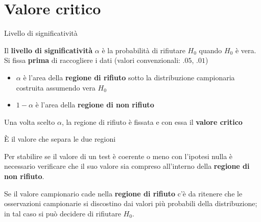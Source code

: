 \documentclass[
  ignorenonframetext,
  compress, aspectratio=149]{beamer}
\providecommand{\tightlist}{%
  \setlength{\itemsep}{0pt}\setlength{\parskip}{0pt}}
\begin{document}
\section{Valore critico}\label{valore-critico}

\begin{frame}{Livello di significatività}
\label{livello-di-significativituxe0}
\small

\begin{tcolorbox}[enhanced jigsaw, opacityback=0, bottomtitle=1mm, bottomrule=.15mm, titlerule=0mm, coltitle=black, toprule=.15mm, breakable, toptitle=1mm, colbacktitle=quarto-callout-tip-color!10!white, arc=.35mm, title={\(\alpha\)}, rightrule=.15mm, leftrule=.75mm, opacitybacktitle=0.6, left=2mm, colframe=quarto-callout-tip-color-frame, colback=white]

Il \textbf{livello di significatività} \(\alpha\) è la probabilità di
rifiutare \(H_0\) quando \(H_0\) è vera. Si fissa \textbf{prima} di
raccogliere i dati (valori convenzionali: \(.05\), \(.01\))

\end{tcolorbox}

\vspace{2mm}

\begin{itemize}
\tightlist
\item
  \(\alpha\) è l'area della \textbf{regione di rifiuto} sotto la
  distribuzione campionaria costruita assumendo vera \(H_0\)
\item
  \(1 - \alpha\) è l'area della \textbf{regione di non rifiuto}
\end{itemize}

\vspace{2mm}

Una volta scelto \(\alpha\), la regione di rifiuto è fissata e con essa
il \textbf{valore critico}
\end{frame}

\begin{frame}{}
\label{section-19}
\small

È il valore che separa le due regioni

\vspace{1.5mm}

Per stabilire se il valore di un test è coerente o meno con l'ipotesi
nulla è necessario verificare che il suo valore sia compreso all'interno
della \textbf{regione di non rifiuto}.

\vspace{1.5mm}

Se il valore campionario cade nella \textbf{regione di rifiuto} c'è da
ritenere che le osservazioni campionarie si discostino dai valori più
probabili della distribuzione; in tal caso si può decidere di rifiutare
\(H_0\).
\end{frame}
\end{document}
